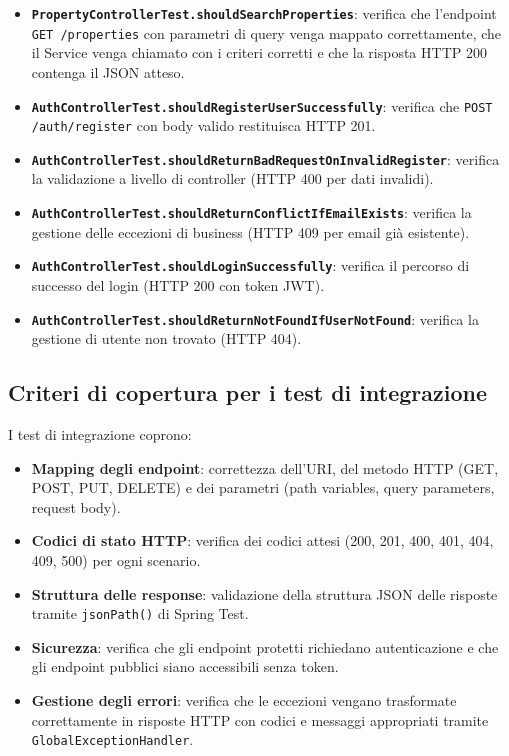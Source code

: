 \documentclass[a4paper,11pt]{report}
\begin{document}
\begin{itemize}[nosep]
  \item \textbf{\texttt{PropertyControllerTest.shouldSearchProperties}}: verifica che l'endpoint \texttt{GET /properties} con parametri di query venga mappato correttamente, che il Service venga chiamato con i criteri corretti e che la risposta HTTP 200 contenga il JSON atteso.
  \item \textbf{\texttt{AuthControllerTest.shouldRegisterUserSuccessfully}}: verifica che \texttt{POST /auth/register} con body valido restituisca HTTP 201.
  \item \textbf{\texttt{AuthControllerTest.shouldReturnBadRequestOnInvalidRegister}}: verifica la validazione a livello di controller (HTTP 400 per dati invalidi).
  \item \textbf{\texttt{AuthControllerTest.shouldReturnConflictIfEmailExists}}: verifica la gestione delle eccezioni di business (HTTP 409 per email già esistente).
  \item \textbf{\texttt{AuthControllerTest.shouldLoginSuccessfully}}: verifica il percorso di successo del login (HTTP 200 con token JWT).
  \item \textbf{\texttt{AuthControllerTest.shouldReturnNotFoundIfUserNotFound}}: verifica la gestione di utente non trovato (HTTP 404).
\end{itemize}
\pagebreak

\subsection{Criteri di copertura per i test di integrazione}

I test di integrazione coprono:

\begin{itemize}[nosep]
  \item \textbf{Mapping degli endpoint}: correttezza dell'URI, del metodo HTTP (GET, POST, PUT, DELETE) e dei parametri (path variables, query parameters, request body).
  \item \textbf{Codici di stato HTTP}: verifica dei codici attesi (200, 201, 400, 401, 404, 409, 500) per ogni scenario.
  \item \textbf{Struttura delle response}: validazione della struttura JSON delle risposte tramite \texttt{jsonPath()} di Spring Test.
  \item \textbf{Sicurezza}: verifica che gli endpoint protetti richiedano autenticazione e che gli endpoint pubblici siano accessibili senza token.
  \item \textbf{Gestione degli errori}: verifica che le eccezioni vengano trasformate correttamente in risposte HTTP con codici e messaggi appropriati tramite \texttt{GlobalExceptionHandler}.
\end{itemize}
\end{document}
